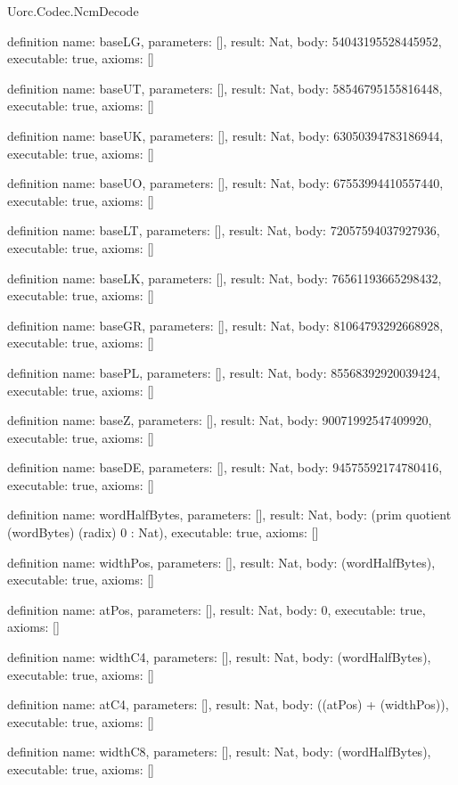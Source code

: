 \begin{lexlean}{Uorc.Codec.NcmDecode}
\begin{semanticmodule}
definition{
  name: baseLG,
  parameters: [],
  result: Nat,
  body: 54043195528445952,
  executable: true,
  axioms: []
}

definition{
  name: baseUT,
  parameters: [],
  result: Nat,
  body: 58546795155816448,
  executable: true,
  axioms: []
}

definition{
  name: baseUK,
  parameters: [],
  result: Nat,
  body: 63050394783186944,
  executable: true,
  axioms: []
}

definition{
  name: baseUO,
  parameters: [],
  result: Nat,
  body: 67553994410557440,
  executable: true,
  axioms: []
}

definition{
  name: baseLT,
  parameters: [],
  result: Nat,
  body: 72057594037927936,
  executable: true,
  axioms: []
}

definition{
  name: baseLK,
  parameters: [],
  result: Nat,
  body: 76561193665298432,
  executable: true,
  axioms: []
}

definition{
  name: baseGR,
  parameters: [],
  result: Nat,
  body: 81064793292668928,
  executable: true,
  axioms: []
}

definition{
  name: basePL,
  parameters: [],
  result: Nat,
  body: 85568392920039424,
  executable: true,
  axioms: []
}

definition{
  name: baseZ,
  parameters: [],
  result: Nat,
  body: 90071992547409920,
  executable: true,
  axioms: []
}

definition{
  name: baseDE,
  parameters: [],
  result: Nat,
  body: 94575592174780416,
  executable: true,
  axioms: []
}

definition{
  name: wordHalfBytes,
  parameters: [],
  result: Nat,
  body: (prim quotient (wordBytes) (radix) 0 : Nat),
  executable: true,
  axioms: []
}

definition{
  name: widthPos,
  parameters: [],
  result: Nat,
  body: (wordHalfBytes),
  executable: true,
  axioms: []
}

definition{
  name: atPos,
  parameters: [],
  result: Nat,
  body: 0,
  executable: true,
  axioms: []
}

definition{
  name: widthC4,
  parameters: [],
  result: Nat,
  body: (wordHalfBytes),
  executable: true,
  axioms: []
}

definition{
  name: atC4,
  parameters: [],
  result: Nat,
  body: ((atPos) + (widthPos)),
  executable: true,
  axioms: []
}

definition{
  name: widthC8,
  parameters: [],
  result: Nat,
  body: (wordHalfBytes),
  executable: true,
  axioms: []
}


\end{semanticmodule}
\end{lexlean}
